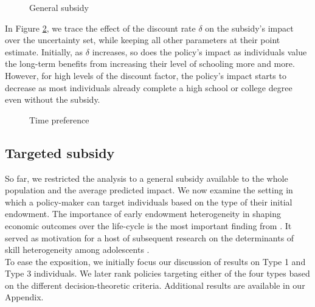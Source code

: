 \begin{figure}[ht!]\centering
{}
\caption{General subsidy}\label{General subsidy}
\end{figure}\FloatBarrier
%
\noindent In Figure \ref{Time preference}, we trace the effect of the discount rate $\delta$ on the subsidy's impact over the uncertainty set, while keeping all other parameters at their point estimate. Initially, as  $\delta$ increases, so does the policy's impact as individuals value the long-term benefits from increasing their level of schooling more and more. However, for high levels of the discount factor, the policy's impact starts to decrease as most individuals already complete a high school or college degree even without the subsidy.
%
\begin{figure}[ht!]\centering
{}
\caption{Time preference}\label{Time preference}
\end{figure}\FloatBarrier
\subsection{Targeted subsidy}
So far, we restricted the analysis to a general subsidy available to the whole population and the average predicted impact. We now examine the setting in which a policy-maker can target individuals based on the type of their initial endowment. The importance of early endowment heterogeneity in shaping economic outcomes over the life-cycle is the most important finding from \citet{Keane.1997}. It served as motivation for a host of subsequent research on the determinants of skill heterogeneity among adolescents \citep{Caucutt.2020,Erosa.2010,Todd.2007}.\\

\noindent To ease the exposition, we initially focus our discussion of results on Type 1 and Type 3 individuals. We later rank policies targeting either of the four types based on the different decision-theoretic criteria. Additional results are available in our Appendix.\\

